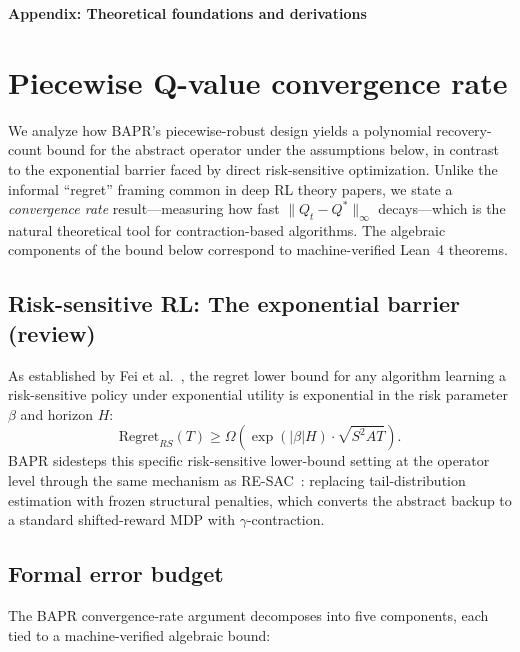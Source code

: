 \newpage
\appendix
\onecolumn
\begin{center}
    {\Large \textbf{Appendix: Theoretical foundations and derivations}}
\end{center}
\vspace{0.5cm}


\section{Piecewise Q-value convergence rate}
\label{app:complexity}

We analyze how BAPR's piecewise-robust design yields a polynomial recovery-count bound for the abstract operator under the assumptions below, in contrast to the exponential barrier faced by direct risk-sensitive optimization. Unlike the informal ``regret'' framing common in deep RL theory papers, we state a \emph{convergence rate} result---measuring how fast $\|Q_t - Q^*\|_\infty$ decays---which is the natural theoretical tool for contraction-based algorithms. The algebraic components of the bound below correspond to machine-verified Lean~4 theorems.

\subsection{Risk-sensitive RL: The exponential barrier (review)}
As established by Fei et al.~\cite{Fei2020RiskSensitive}, the regret lower bound for any algorithm learning a risk-sensitive policy under exponential utility is exponential in the risk parameter $\beta$ and horizon $H$:
\begin{equation}
    \text{Regret}_{RS}(T) \ge \Omega(\exp(|\beta|H) \cdot \sqrt{S^2 A T}).
\end{equation}
BAPR sidesteps this specific risk-sensitive lower-bound setting at the operator level through the same mechanism as RE-SAC~\cite{Zhang2026RESAC}: replacing tail-distribution estimation with frozen structural penalties, which converts the abstract backup to a standard shifted-reward MDP with $\gamma$-contraction.

\subsection{Formal error budget}

The BAPR convergence-rate argument decomposes into five components, each tied to a machine-verified algebraic bound:

